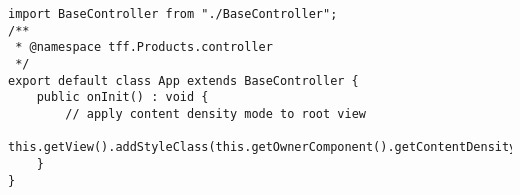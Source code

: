 \begin{mdframed}[backgroundcolor=mygrey2, leftmargin=0.5cm, hidealllines=true, innerleftmargin=3pt, innerrightmargin=0cm, innertopmargin=0cm, innerbottommargin=-3cm, splitbottomskip=0]
\begin{lstlisting}[emph={event, UI5Event, listItem, detail, path}, caption=App Controller der Anwendung]
import BaseController from "./BaseController";
/**
 * @namespace tff.Products.controller
 */
export default class App extends BaseController {
	public onInit() : void {
		// apply content density mode to root view
		this.getView().addStyleClass(this.getOwnerComponent().getContentDensityClass());
	}
}
\end{lstlisting}
\end{mdframed}

























